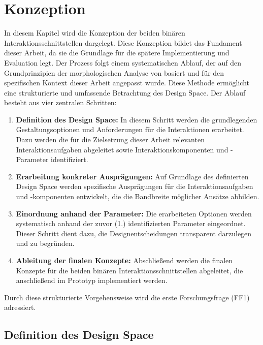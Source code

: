 \chapter{Konzeption}
\label{chap:Konzept}

In diesem Kapitel wird die Konzeption der beiden binären Interaktionsschnittstellen dargelegt. Diese Konzeption bildet das Fundament dieser Arbeit, da sie die Grundlage für die spätere Implementierung und Evaluation legt. Der Prozess folgt einem systematischen Ablauf, der auf den Grundprinzipien der morphologischen Analyse von \citet{10.1007/978-3-642-87617-2_14} basiert und für den spezifischen Kontext dieser Arbeit angepasst wurde. Diese Methode ermöglicht eine strukturierte und umfassende Betrachtung des Design Space. Der Ablauf besteht aus vier zentralen Schritten:

\begin{enumerate}
    \item \textbf{Definition des Design Space:}
    In diesem Schritt werden die grundlegenden Gestaltungsoptionen und Anforderungen für die Interaktionen erarbeitet. Dazu werden die für die Zielsetzung dieser Arbeit relevanten Interaktionsaufgaben abgeleitet sowie Interaktionskomponenten und -Parameter identifiziert.
    \item \textbf{Erarbeitung konkreter Ausprägungen:}
    Auf Grundlage des definierten Design Space werden spezifische Ausprägungen für die Interaktionsaufgaben und -komponenten entwickelt, die die Bandbreite möglicher Ansätze abbilden.
    \item \textbf{Einordnung anhand der Parameter:}
    Die erarbeiteten Optionen werden systematisch anhand der zuvor (1.) identifizierten Parameter eingeordnet. Dieser Schritt dient dazu, die Designentscheidungen transparent darzulegen und zu begründen.
    \item \textbf{Ableitung der finalen Konzepte:}
    Abschließend werden die finalen Konzepte für die beiden binären Interaktionsschnittstellen abgeleitet, die anschließend im Prototyp implementiert werden.
\end{enumerate}
 
Durch diese strukturierte Vorgehensweise wird die erste Forschungsfrage (FF1) adressiert.   

\section{Definition des Design Space}
\label{subchap:DesignSpace}

